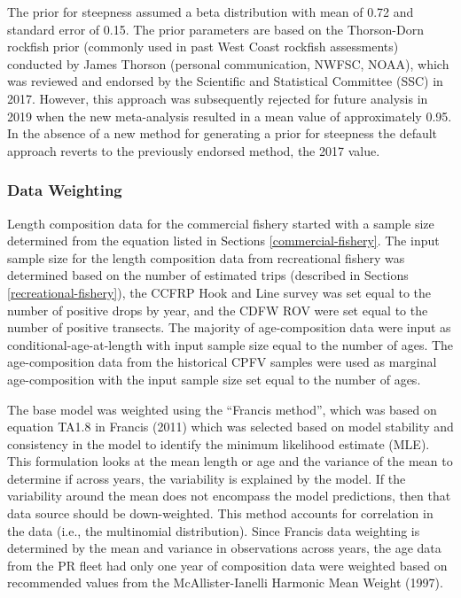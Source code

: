 \documentclass[11pt,
  english,
  letterpaper,
]{article}
\begin{document}
The prior for steepness assumed a beta distribution with mean of 0.72 and standard error of 0.15. The prior parameters are based on the Thorson-Dorn rockfish prior (commonly used in past West Coast rockfish assessments) conducted by James Thorson (personal communication, NWFSC, NOAA), which was reviewed and endorsed by the Scientific and Statistical Committee (SSC) in 2017. However, this approach was subsequently rejected for future analysis in 2019 when the new meta-analysis resulted in a mean value of approximately 0.95. In the absence of a new method for generating a prior for steepness the default approach reverts to the previously endorsed method, the 2017 value.

\hypertarget{data-weighting}{%
\subsubsection{Data Weighting}\label{data-weighting}}

Length composition data for the commercial fishery started with a sample size determined from the equation listed in Sections \ref{commercial-fishery}. The input sample size for the length composition data from recreational fishery was determined based on the number of estimated trips (described in Sections \ref{recreational-fishery}), the CCFRP Hook and Line survey was set equal to the number of positive drops by year, and the CDFW ROV were set equal to the number of positive transects. The majority of age-composition data were input as conditional-age-at-length with input sample size equal to the number of ages. The age-composition data from the historical CPFV samples were used as marginal age-composition with the input sample size set equal to the number of ages.

The base model was weighted using the ``Francis method'', which was based on equation TA1.8 in Francis (2011) which was selected based on model stability and consistency in the model to identify the minimum likelihood estimate (MLE). This formulation looks at the mean length or age and the variance of the mean to determine if across years, the variability is explained by the model. If the variability around the mean does not encompass the model predictions, then that data source should be down-weighted. This method accounts for correlation in the data (i.e., the multinomial distribution). Since Francis data weighting is determined by the mean and variance in observations across years, the age data from the PR fleet had only one year of composition data were weighted based on recommended values from the McAllister-Ianelli Harmonic Mean Weight (1997).
\end{document}
